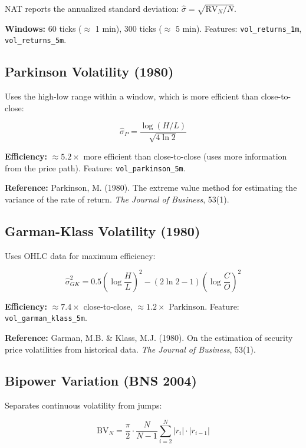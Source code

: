 \documentclass[11pt,a4paper]{article}
\begin{document}
NAT reports the annualized standard deviation: $\hat{\sigma} = \sqrt{\text{RV}_N / N}$.

\textbf{Windows:} 60 ticks ($\approx$ 1 min), 300 ticks ($\approx$ 5 min). Features: \texttt{vol\_returns\_1m}, \texttt{vol\_returns\_5m}.

\subsection{Parkinson Volatility (1980)}

Uses the high-low range within a window, which is more efficient than close-to-close:

\begin{equation}
\hat{\sigma}_P = \frac{\log(H/L)}{\sqrt{4 \ln 2}}
\end{equation}

\textbf{Efficiency:} $\approx 5.2\times$ more efficient than close-to-close (uses more information from the price path). Feature: \texttt{vol\_parkinson\_5m}.

\textbf{Reference:} Parkinson, M. (1980). The extreme value method for estimating the variance of the rate of return. \textit{The Journal of Business}, 53(1).

\subsection{Garman-Klass Volatility (1980)}

Uses OHLC data for maximum efficiency:

\begin{equation}
\hat{\sigma}_{GK}^2 = 0.5 \left(\log \frac{H}{L}\right)^2 - (2\ln 2 - 1)\left(\log \frac{C}{O}\right)^2
\end{equation}

\textbf{Efficiency:} $\approx 7.4\times$ close-to-close, $\approx 1.2\times$ Parkinson. Feature: \texttt{vol\_garman\_klass\_5m}.

\textbf{Reference:} Garman, M.B. \& Klass, M.J. (1980). On the estimation of security price volatilities from historical data. \textit{The Journal of Business}, 53(1).

\subsection{Bipower Variation (BNS 2004)}

Separates continuous volatility from jumps:

\begin{equation}
\text{BV}_N = \frac{\pi}{2} \cdot \frac{N}{N-1} \sum_{i=2}^{N} |r_i| \cdot |r_{i-1}|
\end{equation}
\end{document}
